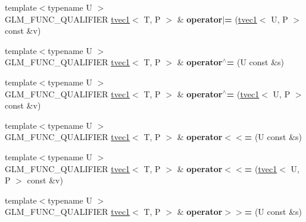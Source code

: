\begin{DoxyCompactItemize}
\item 
\hypertarget{structglm_1_1tvec1_ad748418051a8d9b414a0fddbbc02d5b6}{{\footnotesize template$<$typename U $>$ }\\G\-L\-M\-\_\-\-F\-U\-N\-C\-\_\-\-Q\-U\-A\-L\-I\-F\-I\-E\-R \hyperlink{structglm_1_1tvec1}{tvec1}$<$ T, P $>$ \& {\bfseries operator$\vert$=} (\hyperlink{structglm_1_1tvec1}{tvec1}$<$ U, P $>$ const \&v)}\label{structglm_1_1tvec1_ad748418051a8d9b414a0fddbbc02d5b6}

\item 
\hypertarget{structglm_1_1tvec1_a2e5f9ae769bd0ef94111b45c8a38bb13}{{\footnotesize template$<$typename U $>$ }\\G\-L\-M\-\_\-\-F\-U\-N\-C\-\_\-\-Q\-U\-A\-L\-I\-F\-I\-E\-R \hyperlink{structglm_1_1tvec1}{tvec1}$<$ T, P $>$ \& {\bfseries operator$^\wedge$=} (U const \&s)}\label{structglm_1_1tvec1_a2e5f9ae769bd0ef94111b45c8a38bb13}

\item 
\hypertarget{structglm_1_1tvec1_ac0eea05981ed38c5f1eca0db90d4d768}{{\footnotesize template$<$typename U $>$ }\\G\-L\-M\-\_\-\-F\-U\-N\-C\-\_\-\-Q\-U\-A\-L\-I\-F\-I\-E\-R \hyperlink{structglm_1_1tvec1}{tvec1}$<$ T, P $>$ \& {\bfseries operator$^\wedge$=} (\hyperlink{structglm_1_1tvec1}{tvec1}$<$ U, P $>$ const \&v)}\label{structglm_1_1tvec1_ac0eea05981ed38c5f1eca0db90d4d768}

\item 
\hypertarget{structglm_1_1tvec1_a7e7d31f30b0a3e712a3dd34e130ce3d8}{{\footnotesize template$<$typename U $>$ }\\G\-L\-M\-\_\-\-F\-U\-N\-C\-\_\-\-Q\-U\-A\-L\-I\-F\-I\-E\-R \hyperlink{structglm_1_1tvec1}{tvec1}$<$ T, P $>$ \& {\bfseries operator$<$$<$=} (U const \&s)}\label{structglm_1_1tvec1_a7e7d31f30b0a3e712a3dd34e130ce3d8}

\item 
\hypertarget{structglm_1_1tvec1_a758704df3a9b6ecab58bcfa9baf7582b}{{\footnotesize template$<$typename U $>$ }\\G\-L\-M\-\_\-\-F\-U\-N\-C\-\_\-\-Q\-U\-A\-L\-I\-F\-I\-E\-R \hyperlink{structglm_1_1tvec1}{tvec1}$<$ T, P $>$ \& {\bfseries operator$<$$<$=} (\hyperlink{structglm_1_1tvec1}{tvec1}$<$ U, P $>$ const \&v)}\label{structglm_1_1tvec1_a758704df3a9b6ecab58bcfa9baf7582b}

\item 
\hypertarget{structglm_1_1tvec1_a8f266f05ef30aab071608d5635e1c0f8}{{\footnotesize template$<$typename U $>$ }\\G\-L\-M\-\_\-\-F\-U\-N\-C\-\_\-\-Q\-U\-A\-L\-I\-F\-I\-E\-R \hyperlink{structglm_1_1tvec1}{tvec1}$<$ T, P $>$ \& {\bfseries operator$>$$>$=} (U const \&s)}\label{structglm_1_1tvec1_a8f266f05ef30aab071608d5635e1c0f8}


\end{DoxyCompactItemize}
